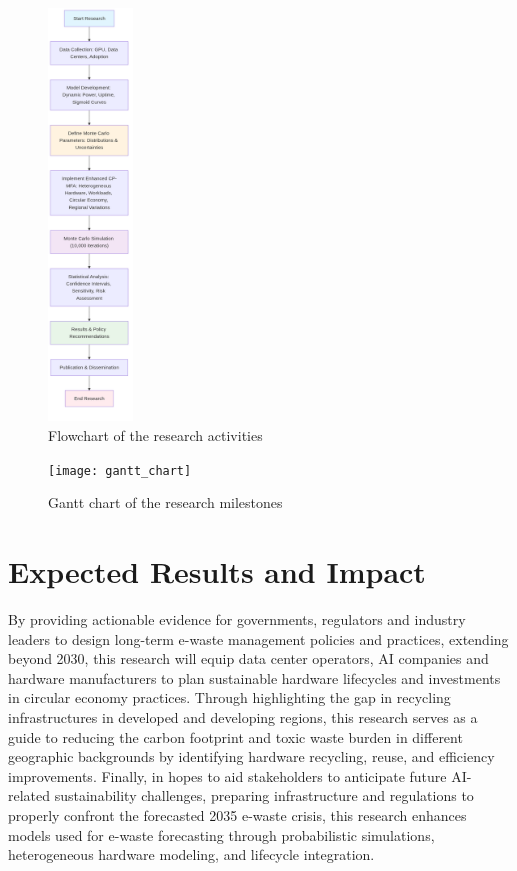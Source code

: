 \documentclass[a4paper, 12pt]{article}
\begin{document}
\begin{figure}[H]
    \begin{center}
        \includegraphics[width=0.2\textwidth]{flowchart}
    \end{center}
    \caption{Flowchart of the research activities}\label{fig:flowchart}
\end{figure}

\begin{figure}[H]
    \begin{center}
        \texttt{[image: gantt\_chart]}
    \end{center}
    \caption{Gantt chart of the research milestones}\label{fig:gantt_chart}
\end{figure}

\section{Expected Results and Impact}
By providing actionable evidence for governments, regulators and industry leaders to design long-term e-waste management policies and practices, extending beyond 2030, this research will equip data center operators, AI companies and hardware manufacturers to plan sustainable hardware lifecycles and investments in circular economy practices. Through highlighting the gap in recycling infrastructures in developed and developing regions, this research serves as a guide to reducing the carbon footprint and toxic waste burden in different geographic backgrounds by identifying hardware recycling, reuse, and efficiency improvements. Finally, in hopes to aid stakeholders to anticipate future AI-related sustainability challenges, preparing infrastructure and regulations to properly confront the forecasted 2035 e-waste crisis, this research enhances models used for e-waste forecasting through probabilistic simulations, heterogeneous hardware modeling, and lifecycle integration.

\printbibliography
\end{document}
